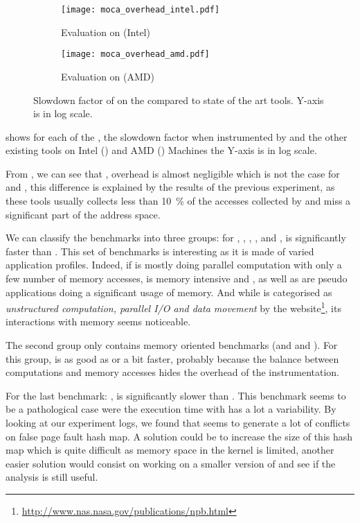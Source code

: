 \begin{figure}[htb]
    \centering
    \begin{subfigure}{\linewidth}
        \texttt{[image: moca\_overhead\_intel.pdf]}
        \caption{Evaluation on \Edel (Intel)}
        \label{fig:ovh-Intel}
    \end{subfigure}
    \begin{subfigure}{\linewidth}
        \texttt{[image: moca\_overhead\_amd.pdf]}
        \caption{Evaluation on \Idfreeze (AMD)}
        \label{fig:ovh-AMD}
    \end{subfigure}
    \caption{Slowdown factor of \Moca on the \NPB compared to state of the art tools.
    Y-axis is in log scale.}
    \label{fig:ovh}
\end{figure}

 shows for each of the \NPB, the slowdown factor when
instrumented by \Moca and the other existing tools on Intel
() and AMD () Machines the Y-axis is in
log scale.

From , we can see that \Mitos, \MitosTun overhead is
almost negligible which is not the case for \Moca and \TABARNAC, this
difference is explained by the results of the previous experiment, as these
tools usually collects less than \SI{10}{\%} of the accesses collected by \Moca and
miss a significant part of the address space.

We can classify the benchmarks into three groups:
for \BT, \CG, \EP, \LU, \SP and \UA, \Moca is
significantly faster than \TABARNAC. This set of benchmarks is interesting as it is made of varied application profiles.
Indeed, if \EP is mostly doing parallel computation with only a few number of
memory accesses, \CG is memory intensive and
\BT, \LU as well as \SP are pseudo applications doing a significant usage of memory.
And while \UA is categorised as \emph{unstructured computation,
parallel I/O and data movement} by the \NPB
website\footnote{\url{http://www.nas.nasa.gov/publications/npb.html}}, its
interactions with memory seems noticeable.

The second group only contains memory oriented benchmarks (\DC and \FT and
\IS). For this group, \Moca is as good as \TABARNAC or a bit faster, probably
because the balance between computations and memory accesses hides the
overhead of the instrumentation.

For the last benchmark: \MG, \Moca is significantly slower than \TABARNAC. This benchmark
seems to be a pathological case were the execution time with \Moca has a lot a
variability. By looking at our experiment logs, we found that \MG seems to
generate a lot of conflicts on \Moca false page fault hash map. A solution
could be to increase the size of this hash map which is quite difficult as
memory space in the kernel is limited, another easier solution would consist on
working on a smaller version of \MG and see if the analysis is still useful.

